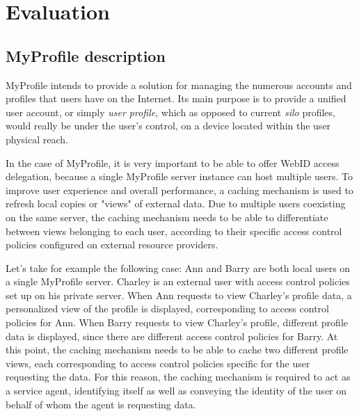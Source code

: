 \documentclass[a4paper]{llncs}
\begin{document}





\section{Evaluation}\label{sec:eval}

\subsection{MyProfile description}
MyProfile intends to provide a solution for managing the numerous accounts and profiles that users have on the Internet. Its main purpose is to provide a unified user account, or simply \textit{user profile}, which as opposed to current \textit{silo} profiles, would really be under the user's control, on a device located within the user physical reach.

In the case of MyProfile, it is very important to be able to offer WebID access delegation, because a single MyProfile server instance can host multiple users. To improve user experience and overall performance, a caching mechanism is used to refresh local copies or "views" of external data. Due to multiple users coexisting on the same server, the caching mechanism needs to be able to differentiate between views belonging to each user, according to their specific access control policies configured on external resource providers.

Let's take for example the following case: Ann and Barry are both local users on a single MyProfile server. Charley is an external user with access control policies set up on his private server. When Ann requests to view Charley's profile data, a personalized view of the profile is displayed, corresponding to access control policies for Ann. When Barry requests to view Charley's profile, different profile data is displayed, since there are different access control policies for Barry. At this point, the caching mechanism needs to be able to cache two different profile views, each corresponding to access control policies specific for the user requesting the data. For this reason, the caching mechanism is required to act as a service agent, identifying itself as well as conveying the identity of the user on  behalf of whom the agent is requesting data.
\end{document}
